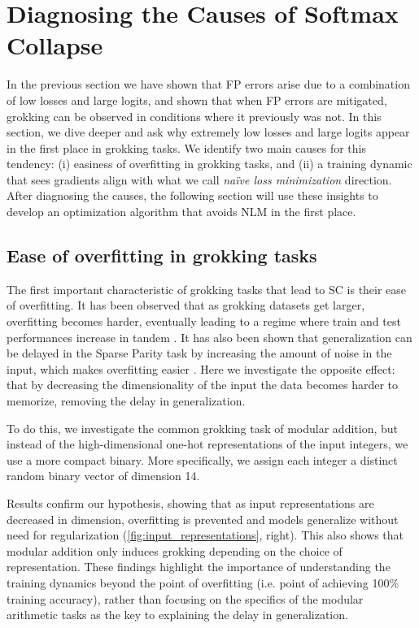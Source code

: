 \section{Diagnosing the Causes of Softmax Collapse}
\label{sec:nlm}

In the previous section we have shown that FP errors arise due to a combination of low losses and large logits, and shown that when FP errors are mitigated, grokking can be observed in conditions where it previously was not. In this section, we dive deeper and ask why extremely low losses and large logits appear in the first place in grokking tasks. We identify two main causes for this tendency: (i) easiness of overfitting in grokking tasks, and (ii) a training dynamic that sees gradients align with what we call \textit{naïve loss minimization} direction. After diagnosing the causes, the following section will use these insights to develop an optimization algorithm that avoids NLM in the first place.

\subsection{Ease of overfitting in grokking tasks}

The first important characteristic of grokking tasks that lead to SC is their ease of overfitting. It has been observed that as grokking datasets get larger, overfitting becomes harder, eventually leading to a regime where train and test performances increase in tandem \citep{power2022grokking, Nanda2023-hf, Varma2023}. It has also been shown that generalization can be delayed in the Sparse Parity task by increasing the amount of noise in the input, which makes overfitting easier \citep{Barak2022-el}. Here we investigate the opposite effect: that by decreasing the dimensionality of the input the data becomes harder to memorize, removing the delay in generalization.

To do this, we investigate the common grokking task of modular addition, but instead of the high-dimensional one-hot representations of the input integers, we use a more compact binary. More specifically, we assign each integer a distinct random binary vector of dimension 14.

Results confirm our hypothesis, showing that as input representations are decreased in dimension, overfitting is prevented and models generalize without need for regularization (\cref{fig:input_representations}, right). This also shows that modular addition only induces grokking depending on the choice of representation. These findings highlight the importance of understanding the training dynamics beyond the point of overfitting (i.e. point of achieving 100\% training accuracy), rather than focusing on the specifics of the modular arithmetic tasks as the key to explaining the delay in generalization.


